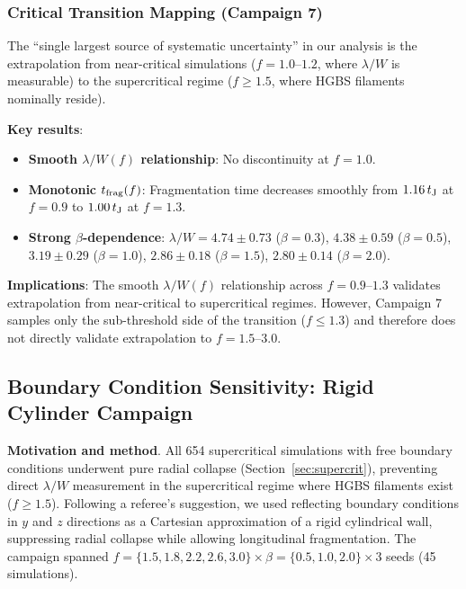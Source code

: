 \documentclass[twocolumn,usenatbib]{mnras}
\begin{document}
\subsubsection{Critical Transition Mapping (Campaign 7)}

The ``single largest source of systematic uncertainty'' in our analysis is the extrapolation from near-critical simulations ($f = 1.0$--$1.2$, where $\lambda/W$ is measurable) to the supercritical regime ($f \geq 1.5$, where HGBS filaments nominally reside).

\textbf{Key results}:
\begin{itemize}
    \item \textbf{Smooth $\lambda/W(f)$ relationship}: No discontinuity at $f = 1.0$.
    \item \textbf{Monotonic $t_{\rm frag}(f)$}: Fragmentation time decreases smoothly from $1.16\,t_{\rm J}$ at $f = 0.9$ to $1.00\,t_{\rm J}$ at $f = 1.3$.
    \item \textbf{Strong $\beta$-dependence}: $\lambda/W = 4.74 \pm 0.73$ ($\beta = 0.3$), $4.38 \pm 0.59$ ($\beta = 0.5$), $3.19 \pm 0.29$ ($\beta = 1.0$), $2.86 \pm 0.18$ ($\beta = 1.5$), $2.80 \pm 0.14$ ($\beta = 2.0$).
\end{itemize}

\textbf{Implications}: The smooth $\lambda/W(f)$ relationship across $f = 0.9$--$1.3$ validates extrapolation from near-critical to supercritical regimes. However, Campaign 7 samples only the sub-threshold side of the transition ($f \leq 1.3$) and therefore does not directly validate extrapolation to $f = 1.5$--$3.0$.

\subsection{Boundary Condition Sensitivity: Rigid Cylinder Campaign}
\label{sec:rigid_cylinder}

\textbf{Motivation and method}. All 654 supercritical simulations with free boundary conditions underwent pure radial collapse (Section~\ref{sec:supercrit}), preventing direct $\lambda/W$ measurement in the supercritical regime where HGBS filaments exist ($f \geq 1.5$). Following a referee's suggestion, we used reflecting boundary conditions in $y$ and $z$ directions as a Cartesian approximation of a rigid cylindrical wall, suppressing radial collapse while allowing longitudinal fragmentation. The campaign spanned $f = \{1.5, 1.8, 2.2, 2.6, 3.0\} \times \beta = \{0.5, 1.0, 2.0\} \times 3$ seeds (45 simulations).
\end{document}
